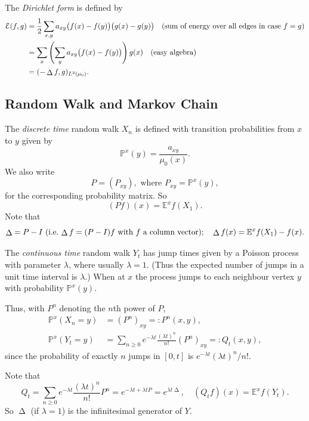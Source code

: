 \documentclass[a4paper]{amsart}
\theoremstyle{plain}
\theoremstyle{definition}
\theoremstyle{remark}
\DeclareMathOperator{\lap}{\Delta}
\begin{document}
\medskip The \emph{Dirichlet form} is defined by 
\begin{align*}
\mathcal{E} (f,g) &= \frac{1}{2} \sum_{x,y} a_{xy} \big( f(x) - f(y) \big) \big( g(x) - g(y) \big) \quad \text{(sum of energy over all edges in case $ f=g $)}\\
     &=  \sum_x \left( \sum_y a_{xy} \big( f(x) - f(y) \big) \right) g(x) \quad \text{(easy algebra)}\\
     &= (-\lap f,g)_{L^2(\mu_0)}.
     \end{align*} 

\subsection{Random Walk and Markov Chain}

The \emph{discrete time} random walk $ X_n $ is defined with transition probabilities from $ x $ to $ y $ given by 
\[ \mathbb{P} ^x (y) = \frac{a_{xy}}{\mu_0(x)}. \]
 We also write 
\[
 P = (P_{xy}) , \text{ where } P_{xy} = \mathbb{P} ^x (y) ,
 \]
  for the corresponding probability matrix.  So
  \[ 
  (Pf )(x)=  \mathbb{E} ^x f(X_1).
  \]
    Note that 
  \[ 
  \lap = P - I \text{ (i.e.\   $ \lap f = (P-I) f $ with $ f $ a column vector)}; \quad \lap f (x)= \mathbb{E} ^x f(X_1) - f(x). 
  \]

\medskip The \emph{continuous time} random walk $ Y_t $ has jump times given by a Poisson process with parameter $ \lambda $, where usually $ \lambda = 1 $.  (Thus the expected number of jumps in a unit time interval is $ \lambda $.)  When at $ x $ the process jumps to each  neighbour   vertex $ y $  with probability $ \mathbb{P} ^x(y) $.

\medskip
 Thus, with $ P^n $ denoting the $ n $th power of $ P $,  
 \begin{align*}
 \mathbb{P} ^x (X_n = y) &= (P^n)_{xy}  =: P^n(x,y), \\
               \mathbb{P} ^x (Y_t = y) &= \sum_{n \geq 0 } e^{-\lambda  t } \frac{(\lambda  t)^n}{n!} (P^n)_{xy}  =: Q_t(x,y),
 \end{align*}
since the probability of exactly $ n $ jumps in $ [0,t] $ is   $ e^{-\lambda  t } (\lambda  t)^n/n!  $.

Note that 
\[
Q_t =  \sum_{n \geq 0 } e^{-\lambda  t } \frac{(\lambda  t)^n}{n!}  P^n = e^{ - \lambda t+  \lambda t P } = e^ {\lambda t \lap },
\quad  (Q_t f )(x)=  \mathbb{E} ^x f(Y_t).
\]
So $ \lap $ (if $ \lambda = 1 $) is the infinitesimal generator of $ Y $.
\end{document}
